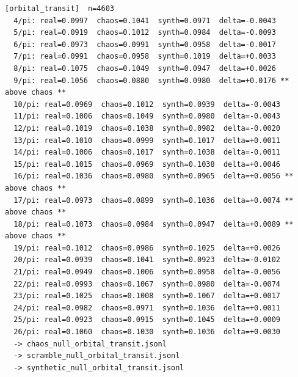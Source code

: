 \documentclass[11pt, letterpaper, openany]{book}
\begin{document}
\begin{empiricalbox}
\begin{lstlisting}[style=terminal]
[orbital_transit]  n=4603
  4/pi: real=0.0997  chaos=0.1041  synth=0.0971  delta=-0.0043
  5/pi: real=0.0919  chaos=0.1012  synth=0.0984  delta=-0.0093
  6/pi: real=0.0973  chaos=0.0991  synth=0.0958  delta=-0.0017
  7/pi: real=0.0991  chaos=0.0958  synth=0.1019  delta=+0.0033
  8/pi: real=0.1075  chaos=0.1049  synth=0.0947  delta=+0.0026
  9/pi: real=0.1056  chaos=0.0880  synth=0.0980  delta=+0.0176 ** above chaos **
  10/pi: real=0.0969  chaos=0.1012  synth=0.0939  delta=-0.0043
  11/pi: real=0.1006  chaos=0.1049  synth=0.0980  delta=-0.0043
  12/pi: real=0.1019  chaos=0.1038  synth=0.0982  delta=-0.0020
  13/pi: real=0.1010  chaos=0.0999  synth=0.1017  delta=+0.0011
  14/pi: real=0.1006  chaos=0.1017  synth=0.1038  delta=-0.0011
  15/pi: real=0.1015  chaos=0.0969  synth=0.1038  delta=+0.0046
  16/pi: real=0.1036  chaos=0.0980  synth=0.0965  delta=+0.0056 ** above chaos **
  17/pi: real=0.0973  chaos=0.0899  synth=0.1036  delta=+0.0074 ** above chaos **
  18/pi: real=0.1073  chaos=0.0984  synth=0.0947  delta=+0.0089 ** above chaos **
  19/pi: real=0.1012  chaos=0.0986  synth=0.1025  delta=+0.0026
  20/pi: real=0.0939  chaos=0.1041  synth=0.0923  delta=-0.0102
  21/pi: real=0.0949  chaos=0.1006  synth=0.0958  delta=-0.0056
  22/pi: real=0.0993  chaos=0.1067  synth=0.0980  delta=-0.0074
  23/pi: real=0.1025  chaos=0.1008  synth=0.1067  delta=+0.0017
  24/pi: real=0.0982  chaos=0.0971  synth=0.1036  delta=+0.0011
  25/pi: real=0.0923  chaos=0.0915  synth=0.1045  delta=+0.0009
  26/pi: real=0.1060  chaos=0.1030  synth=0.1036  delta=+0.0030
  -> chaos_null_orbital_transit.jsonl
  -> scramble_null_orbital_transit.jsonl
  -> synthetic_null_orbital_transit.jsonl


\end{lstlisting}
\end{empiricalbox}
\end{document}
